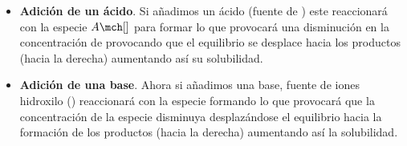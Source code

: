 \begin{enumerate}[label=\numberballmDarkTeal]
\begin{itemize}
    \item \textbf{Adición de un ácido}.
    Si añadimos un ácido (fuente de ) este reaccionará con la especie \( A\mch[] \) para formar  lo que provocará una disminución en la concentración de  provocando que el equilibrio se desplace hacia los productos (hacia la derecha) aumentando así su solubilidad.
    \item \textbf{Adición de una base}.
    Ahora si añadimos una base, fuente de iones hidroxilo () reaccionará con la especie  formando  lo que provocará que la concentración de la especie  disminuya desplazándose el equilibrio hacia la formación de los productos (hacia la derecha) aumentando así la solubilidad.
\end{itemize}

\end{enumerate}
%
%
%



